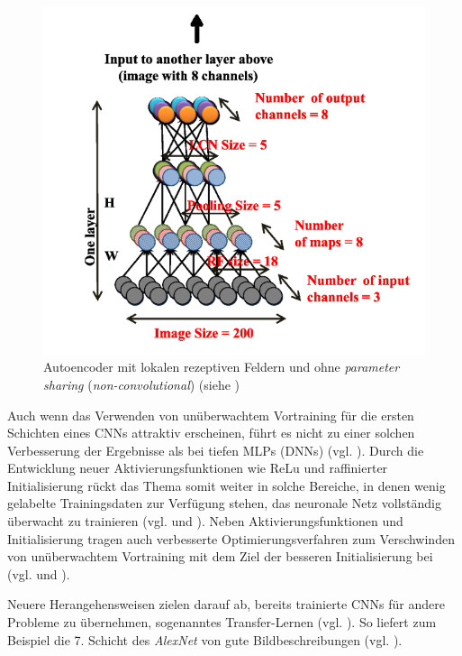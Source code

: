 \begin{figure}
\centering
\includegraphics[width=0.5\linewidth]{images/4_ranzato}
\caption[]{Autoencoder mit lokalen rezeptiven Feldern und ohne \textit{parameter sharing} (\textit{non-convolutional}) (siehe \cite{LeRanzato2012})}
\label{fig:4_ranzato}
\end{figure}


Auch wenn das Verwenden von unüberwachtem Vortraining für die ersten Schichten eines CNNs attraktiv erscheinen, führt es nicht zu einer solchen Verbesserung der Ergebnisse als bei tiefen MLPs (DNNs) (vgl. \cite{Hamid2013}). 
Durch die Entwicklung neuer Aktivierungsfunktionen wie ReLu und raffinierter Initialisierung rückt das Thema somit weiter in solche Bereiche, in denen wenig gelabelte Trainingsdaten zur Verfügung stehen, das neuronale Netz vollständig überwacht zu trainieren (vgl. \cite{Masci2011} und \cite{LeRanzato2012}). Neben Aktivierungsfunktionen und Initialisierung tragen auch verbesserte Optimierungsverfahren zum Verschwinden von unüberwachtem Vortraining mit dem Ziel der besseren Initialisierung bei (vgl. \cite{Martens2010} und \cite{Sutskever2013}). 

Neuere Herangehensweisen zielen darauf ab, bereits trainierte CNNs für andere Probleme zu übernehmen, sogenanntes Transfer-Lernen (vgl. \cite{Wagner2013}). So liefert zum Beispiel die 7. Schicht des \textit{AlexNet} von \cite{Krizhevsky2012} gute Bildbeschreibungen (vgl. \cite{Bell2015}).




